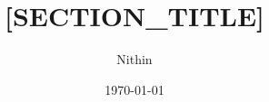 \documentclass{beamer}
\title{[SECTION_TITLE]} %
\author{Nithin}
\institute{}
\date{\today}
\begin{document}
  \begin{frame}
    \titlepage
  \end{frame}

  \begin{frame}
    \tableofcontents
  \end{frame}

\end{document}
